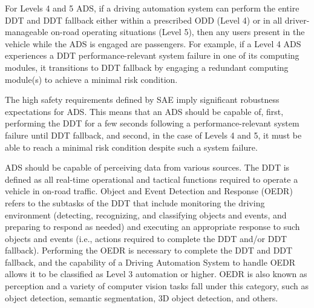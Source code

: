 For Levels 4 and 5 ADS, if a driving automation system can perform the entire DDT and DDT fallback either within a prescribed ODD (Level 4) or in all driver-manageable on-road operating situations (Level 5), then any users present in the vehicle while the ADS is engaged are passengers. For example, if a Level 4 ADS experiences a DDT performance-relevant system failure in one of its computing modules, it transitions to DDT fallback by engaging a redundant computing module(s) to achieve a minimal risk condition.

The high safety requirements defined by SAE imply significant robustness expectations for ADS. This means that an ADS should be capable of, first, performing the DDT for a few seconds following a performance-relevant system failure until DDT fallback, and second, in the case of Levels 4 and 5, it must be able to reach a minimal risk condition despite such a system failure\cite{sae:j3016:2021apr}.


ADS should be capable of perceiving data from various sources. The DDT is defined as all real-time operational and tactical functions required to operate a vehicle in on-road traffic. Object and Event Detection and Response (OEDR) refers to the subtasks of the DDT that include monitoring the driving environment (detecting, recognizing, and classifying objects and events, and preparing to respond as needed) and executing an appropriate response to such objects and events (i.e., actions required to complete the DDT and/or DDT fallback). Performing the OEDR is necessary to complete the DDT and DDT fallback, and the capability of a Driving Automation System to handle OEDR allows it to be classified as Level 3 automation or higher. OEDR is also known as perception and a variety of computer vision tasks fall under this category, such as object detection, semantic segmentation, 3D object detection, and others.

